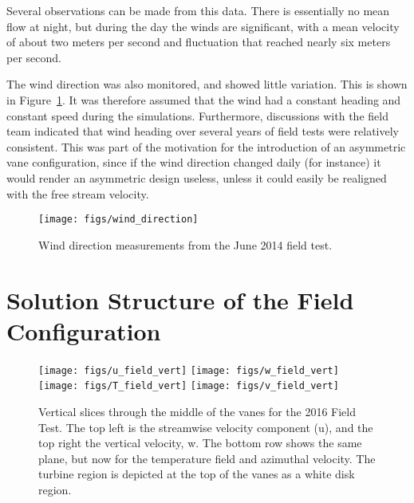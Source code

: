 Several observations can be made from this data. There is essentially no
mean flow at night, but during the day the winds are significant,
with a mean velocity of about two meters per second and fluctuation that
reached nearly six meters per second. 

The wind direction was also monitored, and showed little variation. 
This is shown in Figure~\ref{fig:wind_direction}. It was therefore
assumed that the wind had a constant heading and constant speed during
the simulations. Furthermore, discussions with the field team indicated
that wind heading over several years of field tests were relatively
consistent. This was part of the motivation for the introduction of an
asymmetric vane configuration, since if the wind direction changed daily
(for instance) it would render an asymmetric design useless, unless it
could easily be realigned with the free stream velocity. 

 \begin{figure}[!htb]
  \begin{center}
   \texttt{[image: figs/wind\_direction]}
   \caption{Wind direction measurements from the June 2014 field test.}
   \label{fig:wind_direction}
  \end{center}
 \end{figure}



\section{Solution Structure of the Field Configuration}
\label{subsec:field_predict}

\begin{figure}[!htb]
  \centering
  \texttt{[image: figs/u\_field\_vert]}
  \hfill
  \texttt{[image: figs/w\_field\_vert]}
  \\
  \texttt{[image: figs/T\_field\_vert]}
  \hfill
  \texttt{[image: figs/v\_field\_vert]}
 \caption{Vertical slices through the middle of the vanes for the
 2016 Field Test. The top left is the streamwise velocity component
 (u), and the top right the vertical velocity, w. The bottom row shows
 the same plane, but now for the temperature field and azimuthal
 velocity. The turbine region is depicted at the top of the vanes as a
 white disk region.} 
  \label{fig:field_vert}
\end{figure}

